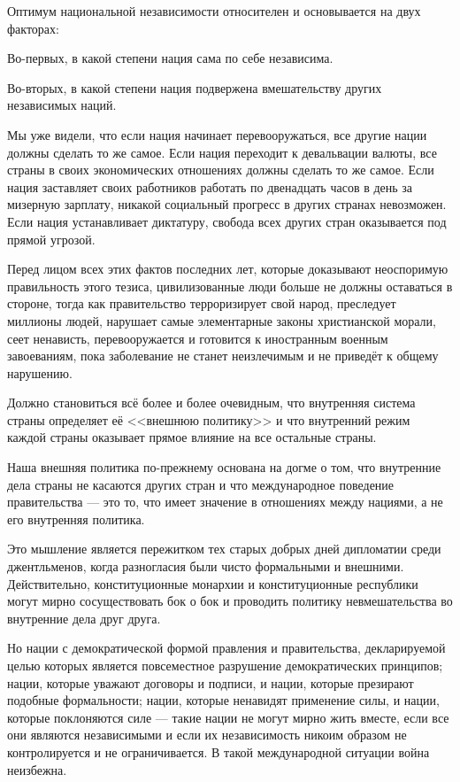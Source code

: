 Оптимум национальной независимости относителен и основывается на двух факторах:

Во-первых, в какой степени нация сама по себе независима.

Во-вторых, в какой степени нация подвержена вмешательству других независимых наций.

Мы уже видели, что если нация начинает перевооружаться, все другие нации должны сделать то же самое. Если нация переходит к девальвации валюты, все страны в своих экономических отношениях должны сделать то же самое. Если нация заставляет своих работников работать по двенадцать часов в день за мизерную зарплату, никакой социальный прогресс в других странах невозможен. Если нация устанавливает диктатуру, свобода всех других стран оказывается под прямой угрозой.

Перед лицом всех этих фактов последних лет, которые доказывают неоспоримую правильность этого тезиса, цивилизованные люди больше не должны оставаться в стороне, тогда как правительство терроризирует свой народ, преследует миллионы людей, нарушает самые элементарные законы христианской морали, сеет ненависть, перевооружается и готовится к иностранным военным завоеваниям, пока заболевание не станет неизлечимым и не приведёт к общему нарушению.

Должно становиться всё более и более очевидным, что внутренняя система страны определяет её <<внешнюю политику>> и что внутренний режим каждой страны оказывает прямое влияние на все остальные страны.

Наша внешняя политика по-прежнему основана на догме о том, что внутренние дела страны не касаются других стран и что международное поведение правительства — это то, что имеет значение в отношениях между нациями, а не его внутренняя политика.

Это мышление является пережитком тех старых добрых дней дипломатии среди джентльменов, когда разногласия были чисто формальными и внешними. Действительно, конституционные монархии и конституционные республики могут мирно сосуществовать бок о бок и проводить политику невмешательства во внутренние дела друг друга.

Но нации с демократической формой правления и правительства, декларируемой целью которых является повсеместное разрушение демократических принципов; нации, которые уважают договоры и подписи, и нации, которые презирают подобные формальности; нации, которые ненавидят применение силы, и нации, которые поклоняются силе — такие нации не могут мирно жить вместе, если все они являются независимыми и если их независимость никоим образом не контролируется и не ограничивается. В такой международной ситуации война неизбежна.

